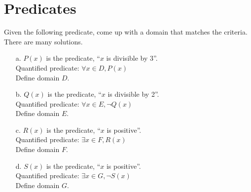     \section{Predicates}

        \begin{questionNOGRADE}{\thequestion}
            Given the following predicate, come up with a domain that matches the criteria.
            There are many solutions.

            \begin{itemize}
                \item[a.]   $P(x)$ is the predicate, ``$x$ is divisible by 3''. \\
                            Quantified predicate: $\forall x \in D, P(x)$ \\
                            Define domain $D$.
                            
                \item[b.]   $Q(x)$ is the predicate, ``$x$ is divisible by 2''. \\
                            Quantified predicate: $\forall x \in E, \neg Q(x)$ \\
                            Define domain $E$.
                            
                \item[c.]   $R(x)$ is the predicate, ``$x$ is positive''. \\
                            Quantified predicate: $\exists x \in F, R(x)$ \\
                            Define domain $F$.
                            
                \item[d.]   $S(x)$ is the predicate, ``$x$ is positive''. \\
                            Quantified predicate: $\exists x \in G, \neg S(x)$ \\
                            Define domain $G$.
            \end{itemize}
        \end{questionNOGRADE}
    
